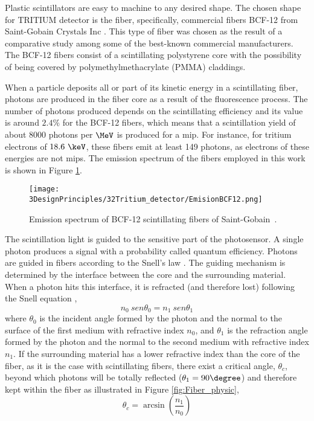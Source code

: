 Plastic scintillators are easy to machine to any desired shape. The chosen shape for TRITIUM detector is the fiber, specifically, commercial fibers BCF-12 from Saint-Gobain Crystals Inc \cite{DataSheetBCF12Fiber}. This type of fiber was chosen as the result of a comparative study \cite{TFGAlberto} among some of the best-known commercial manufacturers. The BCF-12 fibers consist of a scintillating polystyrene core with the possibility of being covered by polymethylmethacrylate (PMMA) claddings. %

When a particle deposits all or part of its kinetic energy in a scintillating fiber, photons are produced in the fiber core as a result of the fluorescence process. The number of photons produced depends on the scintillating efficiency and its value is around $2.4\%$ for the BCF-12 fibers, which means that a scintillation yield of about $8000$ photons per $\MeV$ is produced for a mip. For instance, for tritium electrons of $18.6~\keV$, these fibers emit at least 149 photons, as electrons of these energies are not mips. The emission spectrum of the fibers employed in this work is shown in Figure \ref{fig:EmissionSpectrumFibers}.

\begin{figure}[htbp]
\centering
\texttt{[image: 3DesignPrinciples/32Tritium\_detector/EmisionBCF12.png]}
\caption{Emission spectrum of BCF-12 scintillating fibers of Saint-Gobain\label{fig:EmissionSpectrumFibers}~\cite{DataSheetBCF12Fiber}.}
\end{figure}

The scintillation light is guided to the sensitive part of the photosensor. A single photon produces a signal with a probability called quantum efficiency. Photons are guided in fibers according to the Snell's law \cite{Snell}. The guiding mechanism is determined by the interface between the core and the surrounding material. When a photon hits this interface, it is refracted (and therefore lost) following the Snell equation \cite{Snell}, 
\begin{equation}
n_0~sen\theta_0 = n_1~sen\theta_1
\label{eq:Snell}
\end{equation}
where $\theta_0$ is the incident angle formed by the photon and the normal to the surface of the first medium with refractive index $n_0$, and $\theta_1$  is the refraction angle formed by the photon and the normal to the second medium with refractive index $n_1$. If the surrounding material has a lower refractive index than the core of the fiber, as it is the case with scintillating fibers, there exist a critical angle, $\theta_c$, beyond which photons will be totally reflected ($\theta_1 = 90\degree$) and therefore kept within the fiber as illustrated in Figure \ref{fig:Fiber_physic},
\begin{equation}
\theta_c = \arcsin\left(\frac{n_1}{n_0} \right)
\label{eq:CriticAngle}
\end{equation}

